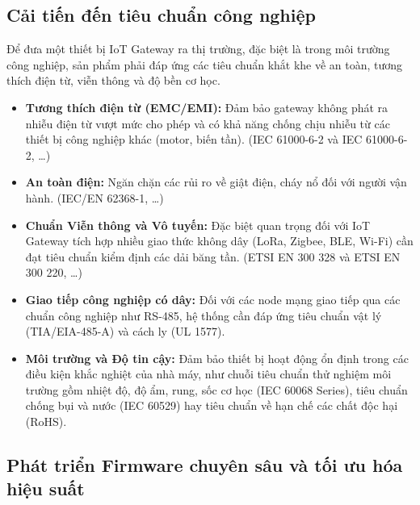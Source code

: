     \subsection{Cải tiến đến tiêu chuẩn công nghiệp}
        Để đưa một thiết bị IoT Gateway ra thị trường, đặc biệt là trong môi trường công nghiệp, sản phẩm phải đáp ứng các tiêu chuẩn khắt khe về an toàn, tương thích điện từ, viễn thông và độ bền cơ học.
        \begin{itemize}
            \item \textbf{Tương thích điện từ (EMC/EMI):} Đảm bảo gateway không phát ra nhiễu điện từ vượt mức cho phép và có khả năng chống chịu nhiễu từ các thiết bị công nghiệp khác (motor, biến tần). (IEC 61000-6-2 và IEC 61000-6-2, \dots)
            \item \textbf{An toàn điện:} Ngăn chặn các rủi ro về giật điện, cháy nổ đối với người vận hành. (IEC/EN 62368-1, \dots)
            \item \textbf{Chuẩn Viễn thông và Vô tuyến:} Đặc biệt quan trọng đối với IoT Gateway tích hợp nhiều giao thức không dây (LoRa, Zigbee, BLE, Wi-Fi) cần đạt tiêu chuẩn kiểm định các dải băng tần. (ETSI EN 300 328 và ETSI EN 300 220, \dots)
            \item \textbf{Giao tiếp công nghiệp có dây:} Đối với các node mạng giao tiếp qua các chuẩn công nghiệp như RS-485, hệ thống cần đáp ứng tiêu chuẩn vật lý (TIA/EIA-485-A) và cách ly (UL 1577).
            \item \textbf{Môi trường và Độ tin cậy:} Đảm bảo thiết bị hoạt động ổn định trong các điều kiện khắc nghiệt của nhà máy, như chuỗi tiêu chuẩn thử nghiệm môi trường gồm nhiệt độ, độ ẩm, rung, sốc cơ học (IEC 60068 Series), tiêu chuẩn chống bụi và nước (IEC 60529) hay tiêu chuẩn về hạn chế các chất độc hại (RoHS).
        \end{itemize}




    \subsection{Phát triển Firmware chuyên sâu và tối ưu hóa hiệu suất}

